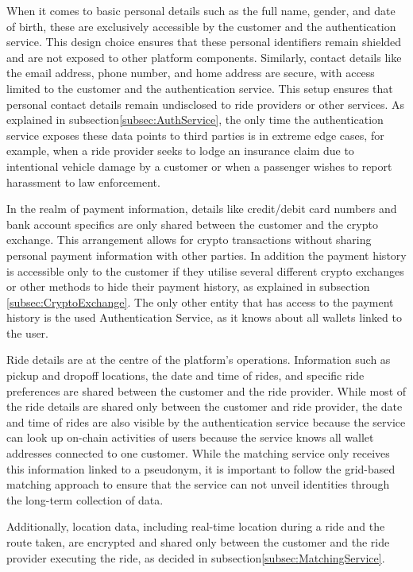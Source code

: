 When it comes to basic personal details such as the full name, gender, and date of birth, these are exclusively accessible by the customer and the authentication service. This design choice ensures that these personal identifiers remain shielded and are not exposed to other platform components. Similarly, contact details like the email address, phone number, and home address are secure, with access limited to the customer and the authentication service. This setup ensures that personal contact details remain undisclosed to ride providers or other services. As explained in subsection\ref{subsec:AuthService}, the only time the authentication service exposes these data points to third parties is in extreme edge cases, for example, when a  ride provider seeks to lodge an insurance claim due to intentional vehicle damage by a customer or when a passenger wishes to report harassment to law enforcement.

In the realm of payment information, details like credit/debit card numbers and bank account specifics are only shared between the customer and the crypto exchange. This arrangement allows for crypto transactions without sharing personal payment information with other parties. In addition the payment history is accessible only to the customer if they utilise several different crypto exchanges or other methods to hide their payment history, as explained in subsection \ref{subsec:CryptoExchange}. The only other entity that has access to the payment history is the used Authentication Service, as it knows about all wallets linked to the user.

Ride details are at the centre of the platform's operations. Information such as pickup and dropoff locations, the date and time of rides, and specific ride preferences are shared between the customer and the ride provider. While most of the ride details are shared only between the customer and ride provider, the date and time of rides are also visible by the authentication service because the service can look up on-chain activities of users because the service knows all wallet addresses connected to one customer. While the matching service only receives this information linked to a pseudonym, it is important to follow the grid-based matching approach to ensure that the service can not unveil identities through the long-term collection of data.

Additionally, location data, including real-time location during a ride and the route taken, are encrypted and shared only between the customer and the ride provider executing the ride, as decided in subsection\ref{subsec:MatchingService}. 

